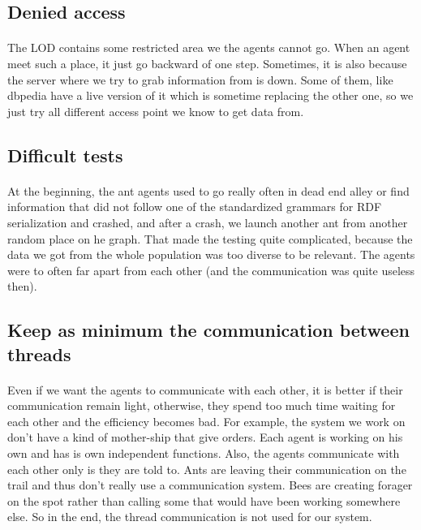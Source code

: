 \documentclass{article}
\begin{document}
	\subsection{Denied access}
		\paragraph{}
			The LOD contains some restricted area we the agents cannot go.
			When an agent meet such a place, it just go backward of one step.
			Sometimes, it is also because the server where we try to grab information from is down.
			Some of them, like dbpedia have a live version of it which is sometime replacing the other one,
			so we just try all different access point we know to get data from.
	\subsection{Difficult tests} %
		\paragraph{}
			At the beginning, the ant agents used to go really often in dead end alley
			or find information that did not follow one of the standardized grammars for RDF serialization and crashed,
			and after a crash, we launch another ant from another random place on he graph.
			That made the testing quite complicated, because the data we got from the whole population was too diverse to be relevant.
			The agents were to often far apart from each other (and the communication was quite useless then).
	\subsection{Keep as minimum the communication between threads} %
		\paragraph{}
			Even if we want the agents to communicate with each other, it is better if their communication remain light,
			otherwise, they spend too much time waiting for each other and the efficiency becomes bad.
			For example, the system we work on don't have a kind of mother-ship that give orders.
			Each agent is working on his own and has is own independent functions.
			Also, the agents communicate with each other only is they are told to.
			Ants are leaving their communication on the trail and thus don't really use a communication system.
			Bees are creating forager on the spot rather than calling some that would have been working somewhere else.
			So in the end, the thread communication is not used for our system.
\end{document}
